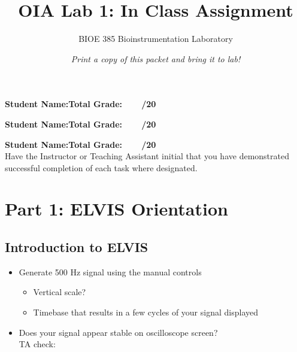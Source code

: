 \documentclass{article}
\title{OIA Lab 1: In Class Assignment}
\author{BIOE 385 Bioinstrumentation Laboratory}
\date{\textit{Print a copy of this packet and bring it to lab!}}
\begin{document}
\large
\maketitle

\textbf{Student Name:}\hfill 	\textbf{Total Grade:\ \ \ \ /20}\vspace{0.5cm}

\textbf{Student Name:}\hfill 	\textbf{Total Grade:\ \ \ \ /20}\vspace{0.5cm}

\textbf{Student Name:}\hfill 	\textbf{Total Grade:\ \ \ \ /20}\\

Have the Instructor or Teaching Assistant initial that you have demonstrated successful completion of each task where designated.

\section*{Part 1: ELVIS Orientation}

\subsection*{Introduction to ELVIS}
\begin{itemize}
	\item Generate 500 Hz signal using the manual controls
		\begin{itemize}
			\item Vertical scale? \underline{\hspace{2cm}}
			\item Timebase that results in a few cycles of your signal displayed \underline{\hspace{2cm}}
		\end{itemize}
	\item Does your signal appear stable on oscilloscope screen?\\TA check: \underline{\hspace{2cm}}
\end{itemize}
\end{document}
